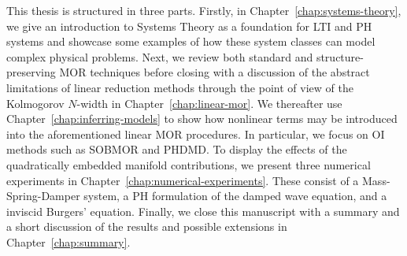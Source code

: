 This thesis is structured in three parts.
Firstly, in Chapter~\ref{chap:systems-theory}, we give an introduction to Systems Theory as a foundation for \ac{LTI} and \ac{PH} systems and showcase some examples of how these system classes can model complex physical problems.
Next, we review both standard and structure-preserving \ac{MOR} techniques before closing with a discussion of the abstract limitations of linear reduction methods through the point of view of the Kolmogorov $N$-width in Chapter~\ref{chap:linear-mor}.
We thereafter use Chapter~\ref{chap:inferring-models} to show how nonlinear terms may be introduced into the aforementioned linear \ac{MOR} procedures.
In particular, we focus on \ac{OI} methods such as \ac{SOBMOR} and \ac{PHDMD}.
To display the effects of the quadratically embedded manifold contributions, we present three numerical experiments in Chapter~\ref{chap:numerical-experiments}.
These consist of a Mass-Spring-Damper system, a \ac{PH} formulation of the damped wave equation, and a inviscid Burgers' equation.
Finally, we close this manuscript with a summary and a short discussion of the results and possible extensions in Chapter~\ref{chap:summary}.
